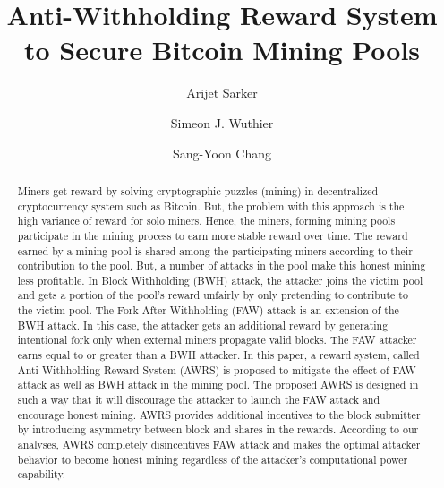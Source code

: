 \documentclass[runningheads]{llncs}
\begin{document}
%
\title{Anti-Withholding Reward System\\
to Secure Bitcoin Mining Pools}
%
%
\author{Arijet Sarker \and
Simeon J. Wuthier \and
Sang-Yoon Chang}
%
%
%
\maketitle              %
%
\begin{abstract}
Miners get reward by solving cryptographic puzzles (mining) in decentralized cryptocurrency system such as Bitcoin. But, the problem with this approach is the high variance of reward for solo miners. Hence, the miners, forming mining pools participate in the mining process to earn more stable reward over time. The reward earned by a mining pool is shared among the participating miners according to their contribution to the pool. But, a number of attacks in the pool make this honest mining less profitable. In Block Withholding (BWH) attack, the attacker joins the victim pool and gets a portion of the pool’s reward unfairly by only pretending to contribute to the victim pool. The Fork After Withholding (FAW) attack is an extension of the BWH attack. In this case, the attacker gets an additional reward by generating intentional fork only when external miners propagate valid blocks. The FAW attacker earns equal to or greater than a BWH attacker. In this paper, a reward system, called Anti-Withholding Reward System (AWRS) is proposed to mitigate the effect of FAW attack as well as BWH attack in the mining pool. The proposed AWRS is designed in such a way that it will discourage the attacker to launch the FAW attack and encourage honest mining. AWRS provides additional incentives to the block submitter by introducing asymmetry between block and shares in the rewards. According to our analyses, AWRS completely disincentives FAW attack and makes the optimal attacker behavior to become honest mining regardless of the attacker's computational power capability. 


\end{abstract}
%
%
%
\end{document}
